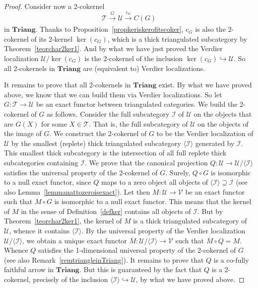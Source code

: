 \documentclass[11pt,reqno,a4paper]{amsart}
\theoremstyle{definition}
\theoremstyle{remark}
\def\nameit#1{\textrm{#1}~}
\def\thex{\nameit{Theorem}}
\def\prox{\nameit{Proposition}}
\def\lemx{\nameit{Lemma}}
\def\defx{\nameit{Definition}}
\def\remx{\nameit{Remark}}
\newcommand{\T}{\mathcal{T}}
\newcommand{\U}{\mathcal{U}}
\newcommand{\0}{\mathbf{0}}
\renewcommand{\1}{\mathbf{1}}
\newcommand{\I}{\mathcal{I}}
\newcommand{\Triang}{\mathbf{Triang}}
\def\:{\colon}
\def\c{\circ}
\newcommand{\contain}{\supseteq}
\newcommand{\aar}[2][]{\xrightarrow[#1]{#2}}
\begin{document}
\begin{proof}
   Consider now a 2-cokernel
   $$\T \aar{G} \U \aar{c_{G}} C(G)$$
   in $\Triang$. Thanks to \prox \ref{propkeriskerofitscoker}, $c_{G}$ is also the 2-cokernel of its 2-kernel $\ker(c_{G})$, which is a thick triangulated subcategory by \thex \ref{teorchar2ker1}. And by what we have just proved the Verdier localization  $\U/\ker(c_{G})$ is the 2-cokernel of the inclusion $\ker(c_G)\hookrightarrow \U$.  So all 2-cokernels in $\Triang$ are (equivalent to) Verdier localizations.

   It remains to prove that all 2-cokernels in $\Triang$ exist. By what we have proved above, we know that we can build them via Verdier localizations. So let $G\:\T\to \U$ be an exact functor between triangulated categories. We build the 2-cokernel of $G$ as follows. Consider the full subcategory $\I$ of $\U$ on the objects that are $G(X)$ for some $X\in \T$. That is, the full subcategory of $\U$ on the objects of the image of $G$. We construct the 2-cokernel of $G$ to be the Verdier localization of $\U$ by the smallest (replete) thick triangulated subcategory $\langle \I \rangle$ generated by $\I$. This smallest thick subcategory is the intersection of all full replete thick subcategories containing $\I$. We prove that the canonical projection $Q\:\U\to \U/\langle \I\rangle$ satisfies the universal property of the 2-cokernel of $G$. Surely, $Q\c G$ is isomorphic to a null exact functor, since $Q$ maps to a zero object all objects of $\langle \I \rangle \contain \I$ (see also \lemx\ref{lemmanattozeroisexact}). Let then $M\:\U\to \mathcal{V}$ be an exact functor such that $M\c G$ is isomorphic to a null exact functor. This means that the kernel of $M$ in the sense of \defx\ref{defker} contains all objects of $\I$. But by \thex\ref{teorchar2ker1}, the kernel of $M$ is a thick triangulated subcategory of $\U$, whence it contains $\langle \I \rangle$. By the universal property of the Verdier localization $\U/\langle \I \rangle$, we obtain a unique exact functor $\overline{M}\:\U/\langle \I \rangle\to \mathcal{V}$ such that $\overline{M}\c Q=M$. Whence $Q$ satisfies the 1-dimensional universal property of the 2-cokernel of $G$ (see also \remx\ref{remtriangleinTriang}). It remains to prove that $Q$ is a co-fully faithful arrow in $\Triang$. But this is guaranteed by the fact that $Q$ is a 2-cokernel, precisely of the inclusion $\langle \I\rangle\hookrightarrow \U$, by what we have proved above.
\end{proof}
\end{document}
